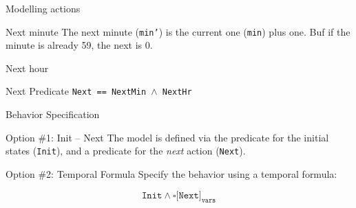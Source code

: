 \begin{frame}{Modelling actions}
    \begin{block}{Next minute}
        The next minute (\texttt{min'}) is the current one (\texttt{min}) plus one. Buf if the minute is already 59, the next is 0.
        \demo
    \end{block}
    \pause
    \begin{block}{Next hour}
    \end{block}
    \begin{block}{Next Predicate}
        \texttt{Next == NextMin $\land$ NextHr}
        \demo
    \end{block}
\end{frame}

\begin{frame}{Behavior Specification}
    \begin{block}{Option \#1: Init -- Next}
        The model is defined via the predicate for the initial states (\texttt{Init}), and a predicate for the \emph{next} action (\texttt{Next}).
        \demo
    \end{block}
    \pause
    \begin{block}{Option \#2: Temporal Formula}
        Specify the behavior using a temporal formula:

        \[
            \texttt{Init} \land \square \texttt{[Next]}_{\texttt{vars}}
        \]
        \demo
    \end{block}
\end{frame}

